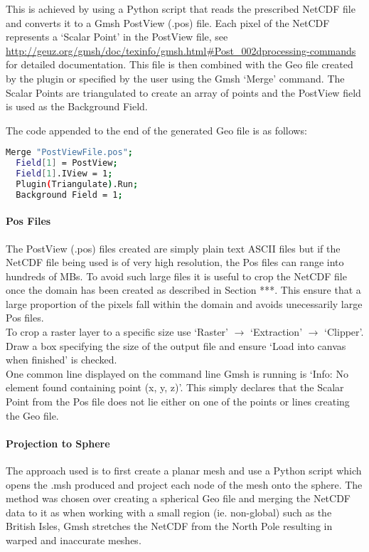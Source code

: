 This is achieved by using a Python script that reads the prescribed NetCDF file and converts it to a Gmsh PostView (.pos) file. Each pixel of the NetCDF represents a `Scalar Point' in the PostView file, see \url{http://geuz.org/gmsh/doc/texinfo/gmsh.html#Post_002dprocessing-commands} for detailed documentation. This file is then combined with the Geo file created by the plugin or specified by the user using the Gmsh `Merge' command. The Scalar Points are triangulated to create an array of points and the PostView field is used as the Background Field. 

The code appended to the end of the generated Geo file is as follows:

\begin{example}
  \begin{lstlisting}[language=bash]
  Merge "PostViewFile.pos";
  Field[1] = PostView;
  Field[1].IView = 1;
  Plugin(Triangulate).Run;
  Background Field = 1;
  \end{lstlisting}
\end{example}


\paragraph{Pos Files \\}
The PostView (.pos) files created are simply plain text ASCII files but if the NetCDF file being used is of very high resolution, the Pos files can range into hundreds of MBs. To avoid such large files it is useful to crop the NetCDF file once the domain has been created as described in Section ***. This ensure that a large proportion of the pixels fall within the domain and avoids unecessarily large Pos files. \\

To crop a raster layer to a specific size use `Raster' $\rightarrow$ `Extraction' $\rightarrow$ `Clipper'. Draw a box specifying the size of the output file and ensure `Load into canvas when finished' is checked. \\

One common line displayed on the command line Gmsh is running is `Info: No element found containing point (x, y, z)'. This simply declares that the Scalar Point from the Pos file does not lie either on one of the points or lines creating the Geo file.

\paragraph{Projection to Sphere \\}
\label{sec:projectionSphere}
The approach used is to first create a planar mesh and use a Python script which opens the .msh produced and project each node of the mesh onto the sphere. The method was chosen over creating a spherical Geo file and merging the NetCDF data to it as when working with a small region (ie. non-global) such as the British Isles, Gmsh stretches the NetCDF from the North Pole resulting in warped and inaccurate meshes. \\

